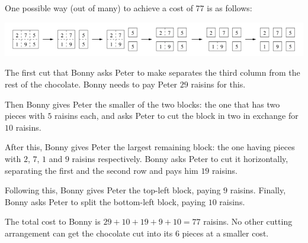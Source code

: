 One possible way (out of many) to achieve a cost of $77$ is as follows:

\includegraphics[scale=0.5]{raisins2.png}

The first cut that Bonny asks Peter to make separates the third column from the rest of the chocolate. Bonny needs to pay Peter $29$ raisins for this.

Then Bonny gives Peter the smaller of the two blocks: the one that has two pieces with $5$ raisins each, and asks Peter to cut the block in two in exchange for $10$ raisins.

After this, Bonny gives Peter the largest remaining block: the one having pieces with $2$, $7$, $1$ and $9$ raisins respectively. Bonny asks Peter to cut it horizontally, separating the first and the second row and pays him $19$ raisins.

Following this, Bonny gives Peter the top-left block, paying $9$ raisins. Finally, Bonny asks Peter to split the bottom-left block, paying $10$ raisins.

The total cost to Bonny is $29 + 10 + 19 + 9 + 10 = 77$ raisins. No other cutting arrangement can get the chocolate cut into its $6$ pieces at a smaller cost. 